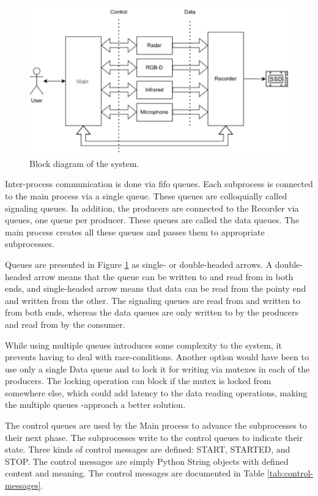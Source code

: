 \begin{figure}[h]
    \centering
    \includegraphics[width=.8\textwidth]{fig/3/block_diagram.pdf}
    \caption{Block diagram of the system.}
    \label{fig:3-block-diagram}
\end{figure}

Inter-process communication is done via \gls{fifo} queues.
Each subprocess is connected to the main process via a single queue.
These queues are colloquially called signaling queues.
In addition, the producers are connected to the Recorder via queues,
one queue per producer. These queues are called the data queues.
The main process creates all these queues and passes them to appropriate subprocesses.

Queues are presented in Figure \ref{fig:3-block-diagram} as single- or double-headed arrows.
A double-headed arrow means that the queue can be written to and read from in both ends,
and single-headed arrow means that data can be read from the pointy end and written from the other.
The signaling queues are read from and written to from both ends,
whereas the data queues are only written to by the producers and read from by the consumer.

While using multiple queues introduces some complexity to the system,
it prevents having to deal with race-conditions.
Another option would have been to use only a single Data queue
and to lock it for writing via mutexes in each of the producers.
The locking operation can block if the mutex is locked from somewhere else,
which could add latency to the data reading operations,
making the multiple queues -approach a better solution.

The control queues are used by the Main process to advance the subprocesses to their next phase.
The subprocesses write to the control queues to indicate their state.
Three kinds of control messages are defined: START, STARTED, and STOP.
The control messages are simply Python String objects with defined content and meaning.
The control messages are documented in Table \ref{tab:control-messages}.

